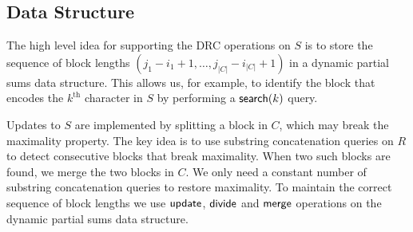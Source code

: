 \subsection{Data Structure}
The high level idea for supporting the DRC operations on $S$ is to store the sequence of block lengths $(j_1-i_1+1, \ldots, j_{|C|}-i_{|C|}+1)$ in a dynamic partial sums data structure. This allows us, for example, to identify the block that encodes the $k^\text{th}$ character in $S$ by performing a $\mathsf{search}(k)$ query.

Updates to $S$ are implemented by splitting a block in $C$, which may break the maximality property. The key idea is to use substring concatenation queries on $R$ to detect consecutive blocks that break maximality. When two such blocks are found, we merge the two blocks in $C$. We only need a constant number of substring concatenation queries to restore maximality. To maintain the correct sequence of block lengths we use $\mathsf{update}$, $\mathsf{divide}$ and $\mathsf{merge}$ operations on the dynamic partial sums data structure.

%

